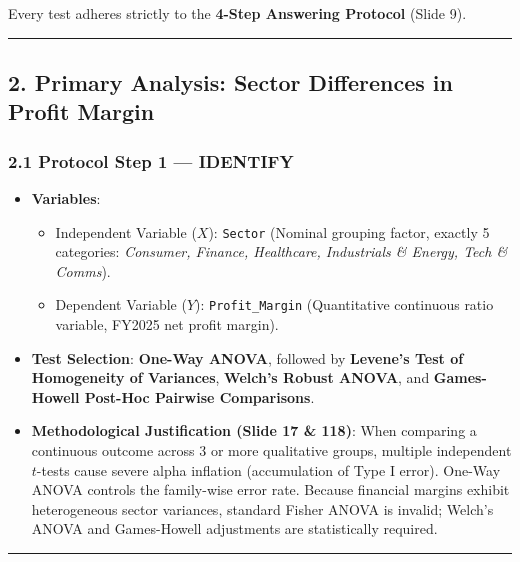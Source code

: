 \documentclass[
]{article}
\providecommand{\tightlist}{%
  \setlength{\itemsep}{0pt}\setlength{\parskip}{0pt}}
\begin{document}
Every test adheres strictly to the \textbf{4-Step Answering Protocol}
(Slide 9).

\begin{center}\rule{0.5\linewidth}{0.5pt}\end{center}

\subsection{2. Primary Analysis: Sector Differences in Profit
Margin}\label{primary-analysis-sector-differences-in-profit-margin}

\subsubsection{2.1 Protocol Step 1 ---
IDENTIFY}\label{protocol-step-1-identify}

\begin{itemize}
\tightlist
\item
  \textbf{Variables}:

  \begin{itemize}
  \tightlist
  \item
    Independent Variable (\(X\)): \texttt{Sector} (Nominal grouping
    factor, exactly 5 categories: \emph{Consumer, Finance, Healthcare,
    Industrials \& Energy, Tech \& Comms}).
  \item
    Dependent Variable (\(Y\)): \texttt{Profit\_Margin} (Quantitative
    continuous ratio variable, FY2025 net profit margin).
  \end{itemize}
\item
  \textbf{Test Selection}: \textbf{One-Way ANOVA}, followed by
  \textbf{Levene's Test of Homogeneity of Variances}, \textbf{Welch's
  Robust ANOVA}, and \textbf{Games-Howell Post-Hoc Pairwise
  Comparisons}.
\item
  \textbf{Methodological Justification (Slide 17 \& 118)}: When
  comparing a continuous outcome across 3 or more qualitative groups,
  multiple independent \(t\)-tests cause severe alpha inflation
  (accumulation of Type I error). One-Way ANOVA controls the family-wise
  error rate. Because financial margins exhibit heterogeneous sector
  variances, standard Fisher ANOVA is invalid; Welch's ANOVA and
  Games-Howell adjustments are statistically required.
\end{itemize}

\begin{center}\rule{0.5\linewidth}{0.5pt}\end{center}
\end{document}
